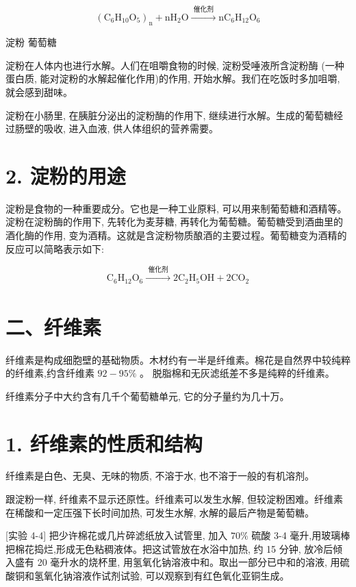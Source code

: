 \documentclass[10pt]{article}
\begin{document}
\[
{\left( {\mathrm{C}}_{6}{\mathrm{H}}_{10}{\mathrm{O}}_{5}\right) }_{\mathrm{n}} + \mathrm{n}{\mathrm{H}}_{2}\mathrm{O}\xrightarrow[]{\text{ 催化剂 }}\mathrm{n}{\mathrm{C}}_{6}{\mathrm{H}}_{12}{\mathrm{O}}_{6}
\]

淀粉 葡萄糖

淀粉在人体内也进行水解。人们在咀嚼食物的时候, 淀粉受唾液所含淀粉酶 (一种蛋白质, 能对淀粉的水解起催化作用)的作用, 开始水解。我们在吃饭时多加咀嚼, 就会感到甜味。

淀粉在小肠里, 在胰脏分泌出的淀粉酶的作用下, 继续进行水解。生成的葡萄糖经过肠壁的吸收, 进入血液, 供人体组织的营养需要。

\section*{2. 淀粉的用途}

淀粉是食物的一种重要成分。它也是一种工业原料, 可以用来制葡萄糖和酒精等。淀粉在淀粉酶的作用下, 先转化为麦芽糖, 再转化为葡萄糖。葡萄糖受到酒曲里的酒化酶的作用, 变为酒精。这就是含淀粉物质酿酒的主要过程。葡萄糖变为酒精的反应可以简略表示如下:

\[
{\mathrm{C}}_{6}{\mathrm{H}}_{12}{\mathrm{O}}_{6}\xrightarrow[]{\text{ 催化剂 }}2{\mathrm{C}}_{2}{\mathrm{H}}_{5}\mathrm{{OH}} + 2{\mathrm{{CO}}}_{2}
\]

\section*{二、纤维素}

纤维素是构成细胞壁的基础物质。木材约有一半是纤维素。棉花是自然界中较纯粹的纤维素,约含纤维素 \({92} - {95}\%\) 。 脱脂棉和无灰滤纸差不多是纯粹的纤维素。

纤维素分子中大约含有几千个葡萄糖单元, 它的分子量约为几十万。

\section*{1. 纤维素的性质和结构}

纤维素是白色、无臭、无味的物质, 不溶于水, 也不溶于一般的有机溶剂。

跟淀粉一样, 纤维素不显示还原性。纤维素可以发生水解, 但较淀粉困难。纤维素在稀酸和一定压强下长时间加热, 可发生水解, 水解的最后产物是葡萄糖。

[实验 4-4] 把少许棉花或几片碎滤纸放入试管里, 加入 \({70}\%\) 硫酸 3-4 毫升,用玻璃棒把棉花捣烂,形成无色粘稠液体。把这试管放在水浴中加热, 约 15 分钟, 放冷后倾入盛有 20 毫升水的烧杯里, 用氢氧化钠溶液中和。取出一部分已中和的溶液, 用硫酸铜和氢氧化钠溶液作试剂试验, 可以观察到有红色氧化亚铜生成。
\end{document}

